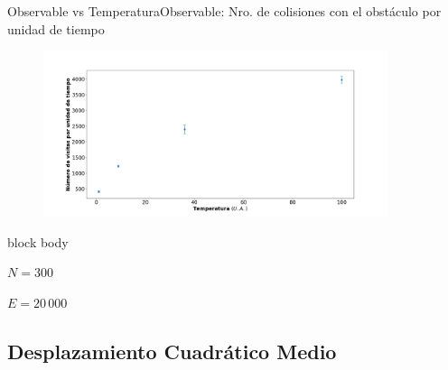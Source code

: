\documentclass{beamer}
\begin{document}
            \begin{frame}{Observable vs Temperatura}{Observable: Nro. de colisiones con el obstáculo por unidad de tiempo}
                \begin{figure}[H!]
                    \includegraphics[width=0.9\textwidth]{./slope_vs_temperature}
                    \label{fig:slope_2}
                \end{figure}
                \begin{beamercolorbox}[sep=5pt,center]{block body}
                    \begin{minipage}[t]{0.45\textwidth}
                        \centering
                        \small{$N=300$}
                    \end{minipage}
                    \hfill
                    \begin{minipage}[t]{0.45\textwidth}
                        \centering
                        \small{$E=20\,000$}
                    \end{minipage}
                \end{beamercolorbox}
            \end{frame}

        \subsection{Desplazamiento Cuadrático Medio}
\end{document}
